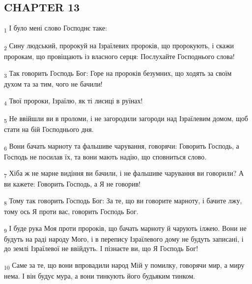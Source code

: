 \subsection{CHAPTER 13}
\begin{tcolorbox}
\textsubscript{1} І було мені слово Господнє таке:
\end{tcolorbox}
\begin{tcolorbox}
\textsubscript{2} Сину людський, пророкуй на Ізраїлевих пророків, що пророкують, і скажи пророкам, що провіщають із власного серця: Послухайте Господнього слова!
\end{tcolorbox}
\begin{tcolorbox}
\textsubscript{3} Так говорить Господь Бог: Горе на пророків безумних, що ходять за своїм духом та за тим, чого не бачили!
\end{tcolorbox}
\begin{tcolorbox}
\textsubscript{4} Твої пророки, Ізраїлю, як ті лисиці в руїнах!
\end{tcolorbox}
\begin{tcolorbox}
\textsubscript{5} Не ввійшли ви в проломи, і не загородили загороди над Ізраїлевим домом, щоб стати на бій Господнього дня.
\end{tcolorbox}
\begin{tcolorbox}
\textsubscript{6} Вони бачать марноту та фальшиве чарування, говорячи: Говорить Господь, а Господь не посилав їх, та вони мають надію, що сповниться слово.
\end{tcolorbox}
\begin{tcolorbox}
\textsubscript{7} Хіба ж не марне видіння ви бачили, і не фальшиве чарування ви говорили? А ви кажете: Говорить Господь, а Я не говорив!
\end{tcolorbox}
\begin{tcolorbox}
\textsubscript{8} Тому так говорить Господь Бог: За те, що ви говорите марноту, і бачите лжу, тому ось Я проти вас, говорить Господь Бог.
\end{tcolorbox}
\begin{tcolorbox}
\textsubscript{9} І буде рука Моя проти пророків, що бачать марноту й чарують ілжею. Вони не будуть на раді народу Мого, і в перепису Ізраїлевого дому не будуть записані, і до землі Ізраїлевої не ввійдуть. І пізнаєте ви, що Я Господь Бог!
\end{tcolorbox}
\begin{tcolorbox}
\textsubscript{10} Саме за те, що вони впровадили народ Мій у помилку, говорячи мир, а миру нема. І він будує мура, а вони тинкують його будьяким тинком.
\end{tcolorbox}

